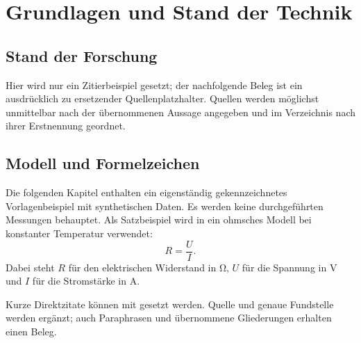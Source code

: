 \chapter{Grundlagen und Stand der Technik}
\label{chap:background}

\section{Stand der Forschung}
Hier wird nur ein Zitierbeispiel gesetzt; der nachfolgende Beleg ist ein
ausdrücklich zu ersetzender Quellenplatzhalter.
Quellen werden möglichst unmittelbar nach der übernommenen Aussage
angegeben und im Verzeichnis nach ihrer Erstnennung geordnet.

\section{Modell und Formelzeichen}
Die folgenden Kapitel enthalten ein eigenständig gekennzeichnetes
Vorlagenbeispiel mit synthetischen Daten. Es werden keine durchgeführten
Messungen behauptet. Als Satzbeispiel wird in  ein ohmsches
Modell bei konstanter Temperatur verwendet:
\begin{equation}
  R = \frac{U}{I}.
  \label{eq:ohm}
\end{equation}
Dabei steht $R$ für den elektrischen Widerstand in \unit{\ohm}, $U$ für
die Spannung in \unit{\volt} und $I$ für die Stromstärke in \unit{\ampere}.

Kurze Direktzitate können mit 
gesetzt werden. Quelle und genaue Fundstelle werden ergänzt; auch
Paraphrasen und übernommene Gliederungen erhalten einen Beleg.
